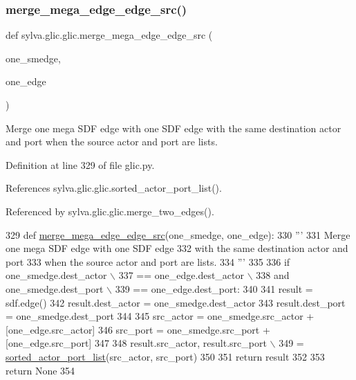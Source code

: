 \subsubsection{\texorpdfstring{merge\+\_\+mega\+\_\+edge\+\_\+edge\+\_\+src()}{merge\_mega\_edge\_edge\_src()}}
{\footnotesize\ttfamily def sylva.\+glic.\+glic.\+merge\+\_\+mega\+\_\+edge\+\_\+edge\+\_\+src (\begin{DoxyParamCaption}\item[{}]{one\+\_\+smedge,  }\item[{}]{one\+\_\+edge }\end{DoxyParamCaption})}

\begin{DoxyVerb}  Merge one mega SDF edge with one SDF edge
  with the same destination actor and port
  when the source actor and port are lists.
\end{DoxyVerb}
 

Definition at line 329 of file glic.\+py.



References sylva.\+glic.\+glic.\+sorted\+\_\+actor\+\_\+port\+\_\+list().



Referenced by sylva.\+glic.\+glic.\+merge\+\_\+two\+\_\+edges().


\begin{DoxyCode}
329     \textcolor{keyword}{def }\hyperlink{namespacesylva_1_1glic_1_1glic_adaac876d9630352fd0f5e4e3350d5b30}{merge\_mega\_edge\_edge\_src}(one\_smedge, one\_edge):
330         \textcolor{stringliteral}{'''}
331 \textcolor{stringliteral}{          Merge one mega SDF edge with one SDF edge}
332 \textcolor{stringliteral}{          with the same destination actor and port}
333 \textcolor{stringliteral}{          when the source actor and port are lists.}
334 \textcolor{stringliteral}{        '''}
335 
336         \textcolor{keywordflow}{if} one\_smedge.dest\_actor \(\backslash\)
337                 == one\_edge.dest\_actor \(\backslash\)
338                 \textcolor{keywordflow}{and} one\_smedge.dest\_port \(\backslash\)
339                 == one\_edge.dest\_port:
340 
341             result = sdf.edge()
342             result.dest\_actor = one\_smedge.dest\_actor
343             result.dest\_port = one\_smedge.dest\_port
344 
345             src\_actor = one\_smedge.src\_actor + [one\_edge.src\_actor]
346             src\_port = one\_smedge.src\_port + [one\_edge.src\_port]
347 
348             result.src\_actor, result.src\_port \(\backslash\)
349                 = \hyperlink{namespacesylva_1_1glic_1_1glic_af9c053311339f7220d8a605b492126c0}{sorted\_actor\_port\_list}(src\_actor, src\_port)
350 
351             \textcolor{keywordflow}{return} result
352 
353         \textcolor{keywordflow}{return} \textcolor{keywordtype}{None}
354 
\end{DoxyCode}
\mbox{\label{namespacesylva_1_1glic_1_1glic_aa4a9eb6227bd109eec96e5c1ad6579c5}} 
